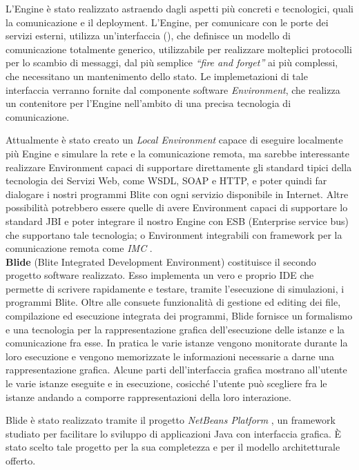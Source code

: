 L'Engine è stato realizzato astraendo dagli aspetti più concreti e
tecnologici, quali la comunicazione e il deployment. L'Engine, per comunicare
con le porte dei servizi esterni, utilizza un'interfaccia
(), che definisce un modello di comunicazione totalmente
generico, utilizzabile per realizzare molteplici protocolli per lo scambio di
messaggi, dal più semplice \emph{``fire and forget''} ai più complessi, che necessitano un
mantenimento dello stato. Le implemetazioni di tale interfaccia verranno fornite
dal componente software \emph{Environment}, che realizza un contenitore per
l'Engine nell'ambito di una precisa tecnologia di comunicazione. 

Attualmente è stato creato un \emph{Local Environment} capace di eseguire
localmente più Engine e simulare la rete e la comunicazione remota, ma sarebbe
interessante realizzare Environment capaci di supportare direttamente gli
standard tipici della tecnologia dei Servizi Web, come WSDL, SOAP e HTTP, e poter
quindi far dialogare i nostri programmi Blite con ogni servizio disponibile in
Internet. Altre possibilità potrebbero essere quelle di avere Environment capaci
di supportare lo standard JBI \cite{JBI} e poter integrare il nostro Engine con
ESB (Enterprise service bus) che supportano tale tecnologia; o Environment
integrabili con framework per la comunicazione remota come \emph{IMC} \cite{IMC}.
\\

\textbf{Blide} (Blite Integrated Development Environment) costituisce il
secondo progetto software realizzato. Esso implementa un
vero e proprio IDE che permette di scrivere rapidamente e testare, tramite
l'esecuzione di simulazioni, i programmi Blite. Oltre alle consuete
funzionalità di gestione ed editing dei file, compilazione ed esecuzione
integrata dei programmi, Blide fornisce un formalismo e una tecnologia per la
rappresentazione grafica dell'esecuzione delle istanze e la comunicazione fra
esse. In pratica le varie istanze vengono monitorate durante la loro esecuzione
e vengono memorizzate le informazioni necessarie a darne una rappresentazione
grafica. Alcune parti dell'interfaccia grafica mostrano all'utente le varie
istanze eseguite e in esecuzione, cosicché l'utente può scegliere fra le istanze
andando a comporre rappresentazioni della loro interazione.

Blide è stato realizzato tramite il progetto \emph{NetBeans Platform}
\cite{NBPlatSite}, un framework studiato per facilitare lo sviluppo di applicazioni
Java con interfaccia grafica. \`E stato scelto tale progetto per la sua
completezza e per il modello architetturale offerto. 

